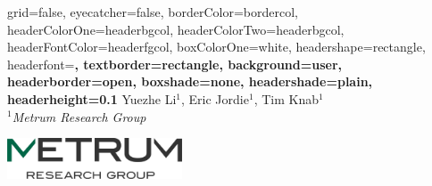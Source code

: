 \documentclass[a0paper,portrait]{baposter}
\begin{document}

\background{
}

\begin{poster}{
	grid=false,
	eyecatcher=false, 
	borderColor=bordercol,
	headerColorOne=headerbgcol,
	headerColorTwo=headerbgcol,
	headerFontColor=headerfgcol,
	boxColorOne=white,
	headershape=rectangle,
	headerfont=\Large\bf\textsf,
	textborder=rectangle,
	background=user,
	headerborder=open,
  boxshade=none, 
  headershade=plain,
  headerheight=0.1\textheight %
}
{
}
{
	\textbf{\textsf{\color{titlefgcol}{
	\huge
	  A multi-organ integrated QSP model for hematopoietic stem cell differentiation to predict the immune cell reconstitution in ex-vivo gene therapy
	 }}}\vspace{.5em}
}
{
\normalsize
	Yuezhe Li$^1$, Eric Jordie$^1$, Tim Knab$^1$\\
	{\smaller
	  $^1$\textit{Metrum Research Group}
	}
}
{
		\begin{minipage}{16em}
			\begin{center}
			\includegraphics[width=14em]{newlogo} 
			\end{center}
		\end{minipage}
}



\end{poster}
\end{document}
